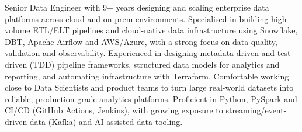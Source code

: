 

\begin{cvparagraph}

Senior Data Engineer with 9+ years designing and scaling enterprise data platforms across cloud and on-prem environments. Specialised in building high-volume ETL/ELT pipelines and cloud-native data infrastructure using Snowflake, DBT, Apache Airflow and AWS/Azure, with a strong focus on data quality, validation and observability. Experienced in designing metadata-driven and test-driven (TDD) pipeline frameworks, structured data models for analytics and reporting, and automating infrastructure with Terraform. Comfortable working close to Data Scientists and product teams to turn large real-world datasets into reliable, production-grade analytics platforms. Proficient in Python, PySpark and CI/CD (GitHub Actions, Jenkins), with growing exposure to streaming/event-driven data (Kafka) and AI-assisted data tooling.
\end{cvparagraph}
